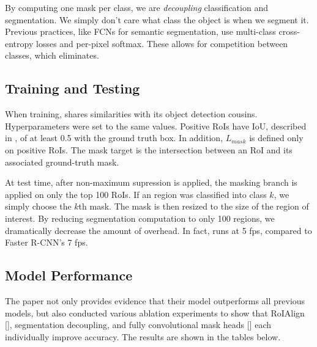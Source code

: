 By computing one mask per class, we are \textit{decoupling} classification and segmentation. We simply don't care what class the object is when we segment it. Previous practices, like FCNs for semantic segmentation, use multi-class cross-entropy losses and per-pixel softmax. These allows for competition between classes, which \maskrcnn eliminates.

\subsection{Training and Testing}
When training, \maskrcnn shares similarities with its object detection cousins. Hyperparameters were set to the same values. Positive RoIs have IoU, described in , of at least 0.5 with the ground truth box. In addition, $L_{mask}$ is defined only on positive RoIs. The mask target is the intersection between an RoI and its associated ground-truth mask. 

At test time, after non-maximum supression is applied, the masking branch is applied on only the top 100 RoIs. If an region was classified into class $k$, we simply choose the $k$th mask. The mask is then resized to the size of the region of interest. By reducing segmentation computation to only 100 regions, we dramatically decrease the amount of overhead. In fact, \maskrcnn runs at 5 fps, compared to Faster R-CNN's 7 fps.

\subsection{Model Performance}
The \maskrcnn paper \cite{He_2017} not only provides evidence that their model outperforms all previous models, but also conducted various ablation experiments to show that RoIAlign [], segmentation decoupling, and fully convolutional mask heads [] each individually improve accuracy. The results are shown in the tables below.


